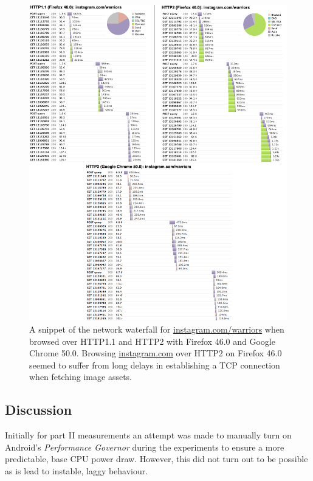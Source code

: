 \documentclass{article}
\begin{document}
\begin{figure}[h!]
    \centering
    \includegraphics[width=1.1\linewidth]{images/waterfall_instagram}
    \caption{A snippet of the network waterfall for \url{instagram.com/warriors} when browsed over HTTP1.1 and HTTP2 with Firefox 46.0 and Google Chrome 50.0. Browsing \url{instagram.com} over HTTP2 on Firefox 46.0 seemed to suffer from long delays in establishing a TCP connection when fetching image assets.}
    \label{fig:instagram-waterfall}
\end{figure}

\clearpage

\subsection{Discussion}
\label{chapter:discussion-part2}

Initially for part II measurements an attempt was made to manually turn on Android's \emph{Performance Governor} during the experiments to ensure a more predictable, base CPU power draw. However, this did not turn out to be possible as is lead to instable, laggy behaviour.
\end{document}
